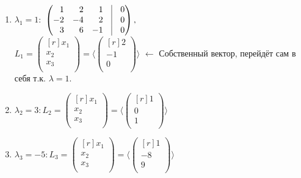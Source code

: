 \begin{enumerate}
	\item{
		$\lambda_1=1 :$
		$\begin{pmatrix*}[r]
		1 & 2 & 1 & \vrule & 0\\
		-2 & -4 & 2 & \vrule & 0\\
		3 & 6 & -1 & \vrule & 0\\
		\end{pmatrix*} , $\\
		$
		L_1=
		\left(
		\begin{smallmatrix*}[r]
		x_1\\ x_2\\ x_3\\ 
		\end{smallmatrix*}
		\right) 
		=
		\langle
		\left(
		\begin{smallmatrix*}[r]
		2\\ -1\\ 0\\ 
		\end{smallmatrix*}
		\right) 
		\rangle
		$
		$\leftarrow $
		Собственный вектор, перейдёт сам в себя т.к. $\lambda=1$.
	}
	\item{
		$\lambda_2=3 :
		L_2=
		\left(
		\begin{smallmatrix*}[r]
		x_1\\ x_2\\ x_3\\ 
		\end{smallmatrix*}
		\right) 
		=
		\langle
		\left(
		\begin{smallmatrix*}[r]
		1\\ 0\\ 1\\ 
		\end{smallmatrix*}
		\right) 
		\rangle
		$
	}
	\item{
		$\lambda_3=-5 :
		L_3=
		\left(
		\begin{smallmatrix*}[r]
		x_1\\ x_2\\ x_3\\ 
		\end{smallmatrix*}
		\right) 
		=
		\langle
		\left(
		\begin{smallmatrix*}[r]
		1\\ -8\\ 9\\ 
		\end{smallmatrix*}
		\right) 
		\rangle
		$
	}
\end{enumerate}

